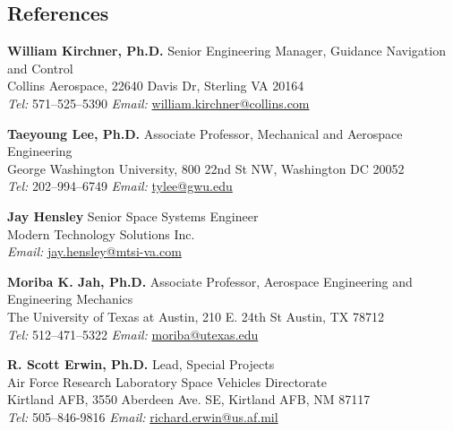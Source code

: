 \subsection*{References}
{}

\textbf{William Kirchner, Ph.D.}
Senior Engineering Manager, Guidance Navigation and Control\\
Collins Aerospace, 22640 Davis Dr, Sterling VA 20164\\
\textit{Tel:} 571--525--5390 \hspace{1cm} \textit{Email:} \href{mailto:william.kirchner@collins.com}{william.kirchner@collins.com}

\textbf{Taeyoung Lee, Ph.D.}
Associate Professor, Mechanical and Aerospace Engineering\\
George Washington University, 800 22nd St NW, Washington DC 20052 \\
\textit{Tel:} 202--994--6749 \hspace{1cm} \textit{Email:} \href{mailto:tylee@gwu.edu}{tylee@gwu.edu}

\textbf{Jay Hensley}
Senior Space Systems Engineer\\
Modern Technology Solutions Inc.\\
\textit{Email:} \href{mailto:jay.hensley@mtsi-va.com}{jay.hensley@mtsi-va.com}

\textbf{Moriba K. Jah, Ph.D.}
Associate Professor, Aerospace Engineering and Engineering Mechanics \\
The University of Texas at Austin, 210 E. 24th St Austin, TX 78712 \\
\textit{Tel:} 512--471--5322 \hspace{1cm} \textit{Email:} \href{mailto:moriba@utexas.edu}{moriba@utexas.edu}

\textbf{R. Scott Erwin, Ph.D.}
    Lead, Special Projects\\
Air Force Research Laboratory Space Vehicles Directorate\\
Kirtland AFB, 3550 Aberdeen Ave. SE, Kirtland AFB, NM 87117\\
\textit{Tel:} 505--846-9816 \hspace{1cm} \textit{Email:} \href{mailto:richard.erwin@us.af.mil}{richard.erwin@us.af.mil}
